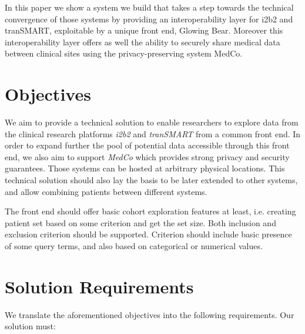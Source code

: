 In this paper we show a system we build that takes a step towards the technical convergence of those systems by providing an interoperability layer for i2b2 and tranSMART, exploitable by a unique front end, Glowing Bear.
Moreover this interoperability layer offers as well the ability to securely share medical data between clinical sites using the privacy-preserving system MedCo.


\section{Objectives}

We aim to provide a technical solution to enable researchers to explore data from the clinical research platforms \emph{i2b2} and \emph{tranSMART} from a common front end.
In order to expand further the pool of potential data accessible through this front end, we also aim to support \emph{MedCo} which provides strong privacy and security guarantees.
Those systems can be hosted at arbitrary physical locations.
This technical solution should also lay the basis to be later extended to other systems, and allow combining patients between different systems.

The front end should offer basic cohort exploration features at least, i.e. creating patient set based on some criterion and get the set size.
Both inclusion and exclusion criterion should be supported.
Criterion should include basic presence of some query terms, and also based on categorical or numerical values.


\section{Solution Requirements}
\label{sec:requirements}

We translate the aforementioned objectives into the following requirements.
Our solution must:

